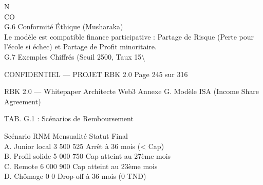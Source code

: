\vspace{0.5em}
\vspace{0.5em}
\vspace{0.5em}
N\\
CO\\
G.6 Conformité Éthique (Musharaka)\\
Le modèle est compatible finance participative : Partage de Risque (Perte pour l’école si échec) et Partage de Profit minoritaire.\\
\vspace{0.5em}
\vspace{0.5em}
\vspace{0.5em}
G.7 Exemples Chiffrés (Seuil 2500, Taux 15\textbackslash{}%
\vspace{0.5em}
\vspace{0.5em}
\vspace{0.5em}
\vspace{0.5em}
\begin{confidential}CONFIDENTIEL — PROJET RBK 2.0                                           Page 245 sur 316\end{confidential}
RBK 2.0 — Whitepaper Architecte Web3                                                     Annexe G. Modèle ISA (Income Share Agreement)\\
\vspace{0.5em}
\vspace{0.5em}
\vspace{0.5em}
\vspace{0.5em}
\begin{center}\begin{tabular}TAB. G.1 : Scénarios de Remboursement\end{tabular}\end{center}
\vspace{0.5em}
\vspace{0.5em}
Scénario         RNM Mensualité Statut Final\\
A. Junior local 3 500 525       Arrêt à 36 mois (\textless{} Cap)\\
B. Profil solide 5 000 750      Cap atteint au 27ème mois\\
C. Remote        6 000 900      Cap atteint au 23ème mois\\
D. Chômage       0     0        Drop-off à 36 mois (0 TND)\\
\vspace{0.5em}
\vspace{0.5em}
\vspace{0.5em}
